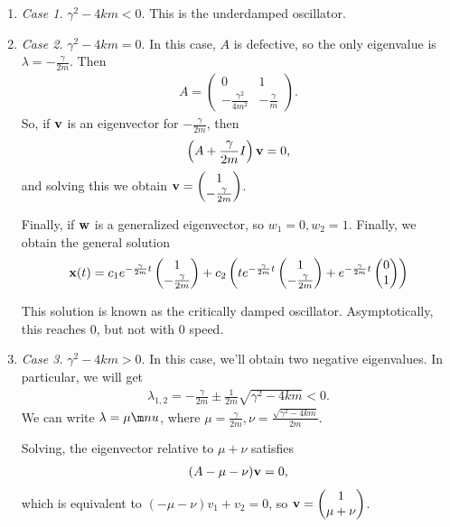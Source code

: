 \documentclass{article}
\newcommand{\mat}[1]{\begin{pmatrix}#1\end{pmatrix}}
\begin{document}
\begin{enumerate}
  \item {\it Case 1.} $\gamma^2 - 4 km < 0$.  This is the underdamped oscillator.

  \item {\it Case 2.} $\gamma^2 - 4 k m = 0$.   In this case, $A$ is defective, so the only eigenvalue is $\lambda = - \frac{\gamma}{2m}$.  Then
    \begin{align*}
      A = \mat{0 & 1 \\ - \frac{\gamma^2}{4m^2} & - \frac{\gamma}{m}}.
    \end{align*}
    So, if $\mathbf{v}$ is an eigenvector for $- \frac{\gamma}{2m}$, then
    \begin{align*}
      \left( A + \frac{\gamma}{2m} I \right) \mathbf{v} = 0,
    \end{align*}
    and solving this we obtain $\mbf{v} = \mat{1 \\ - \frac{\gamma}{2m}}$.

    Finally, if $\mathbf{w}$ is a generalized eigenvector, so $w_1 = 0, w_2 = 1$.  Finally, we obtain the general solution
    \begin{align*}
      \mbf{x}(t) = c_1 e^{- \frac{\gamma}{2m} t} \mat{1 \\ - \frac{\gamma}{2m}} + c_2 \left( t e^{- \frac{\gamma}{2m} t} \mat{1 \\ - \frac{\gamma}{2m}} + e^{- \frac{\gamma}{2m} t} \mat{0 \\ 1}\right)
    \end{align*}

    This solution is known as the critically damped oscillator.  Asymptotically, this reaches 0, but not with 0 speed.
  \item {\it Case 3.} $\gamma^2 - 4 km > 0$.  In this case, we'll obtain two negative eigenvalues.  In particular, we will get
    \begin{align*}
      \lambda_{1, 2} = - \frac{\gamma}{2m} \pm \frac{1}{2m} \sqrt{\gamma^2 - 4 km} < 0.
    \end{align*}
    We can write $\lambda = \mu \m nu$, where $\mu = \frac{\gamma}{2m}, \nu = \frac{\sqrt{\gamma^2 - 4km}}{2m}$.

    Solving, the eigenvector relative to $\mu + \nu$ satisfies
    \begin{align*}
      (A - \mu - \nu) \mathbf{v} = 0,
    \end{align*}
    which is equivalent to  $\left( - \mu - \nu \right) v_1 + v_2 = 0$, so $\mbf{v} = \mat{1 \\ \mu + \nu}$.


\end{enumerate}
\end{document}
